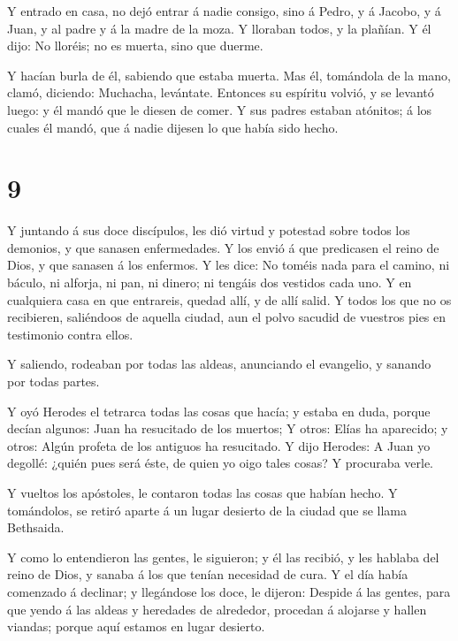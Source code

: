  Y entrado en casa, no dejó entrar á nadie consigo, sino á
Pedro, y á Jacobo, y á Juan, y al padre y á la madre de la moza.
 Y lloraban todos, y la plañían. Y él dijo: No lloréis; no
es muerta, sino que duerme.

 Y hacían burla de él, sabiendo que estaba muerta.
 Mas él, tomándola de la mano, clamó, diciendo: Muchacha,
levántate.  Entonces su espíritu volvió, y se levantó
luego: y él mandó que le diesen de comer.  Y sus padres
estaban atónitos; á los cuales él mandó, que á nadie dijesen lo que
había sido hecho.

\hypertarget{section-8}{%
\section{9}\label{section-8}}

 Y juntando á sus doce discípulos, les dió virtud y potestad
sobre todos los demonios, y que sanasen enfermedades.  Y los
envió á que predicasen el reino de Dios, y que sanasen á los enfermos.
 Y les dice: No toméis nada para el camino, ni báculo, ni
alforja, ni pan, ni dinero; ni tengáis dos vestidos cada uno.
 Y en cualquiera casa en que entrareis, quedad allí, y de
allí salid.  Y todos los que no os recibieren, saliéndoos de
aquella ciudad, aun el polvo sacudid de vuestros pies en testimonio
contra ellos.

 Y saliendo, rodeaban por todas las aldeas, anunciando el
evangelio, y sanando por todas partes.

 Y oyó Herodes el tetrarca todas las cosas que hacía; y
estaba en duda, porque decían algunos: Juan ha resucitado de los
muertos;  Y otros: Elías ha aparecido; y otros: Algún
profeta de los antiguos ha resucitado.  Y dijo Herodes: A
Juan yo degollé: ¿quién pues será éste, de quien yo oigo tales cosas? Y
procuraba verle.

 Y vueltos los apóstoles, le contaron todas las cosas que
habían hecho. Y tomándolos, se retiró aparte á un lugar desierto de la
ciudad que se llama Bethsaida.

 Y como lo entendieron las gentes, le siguieron; y él las
recibió, y les hablaba del reino de Dios, y sanaba á los que tenían
necesidad de cura.  Y el día había comenzado á declinar; y
llegándose los doce, le dijeron: Despide á las gentes, para que yendo á
las aldeas y heredades de alrededor, procedan á alojarse y hallen
viandas; porque aquí estamos en lugar desierto.

